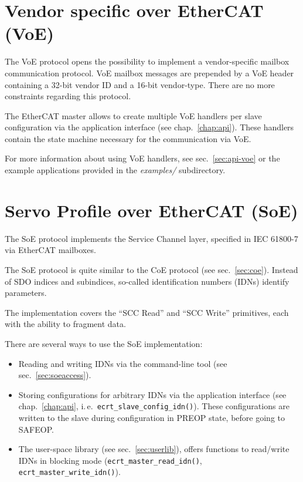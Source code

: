 \documentclass[a4paper,12pt,BCOR6mm,bibtotoc,idxtotoc]{scrbook}
\begin{document}

\section{Vendor specific over EtherCAT (VoE)}
\label{sec:voe}

The VoE protocol opens the possibility to implement a vendor-specific mailbox
communication protocol. VoE mailbox messages are prepended by a VoE header
containing a 32-bit vendor ID and a 16-bit vendor-type. There are no more
constraints regarding this protocol.

The EtherCAT master allows to create multiple VoE handlers per slave
configuration via the application interface (see chap.~\ref{chap:api}). These
handlers contain the state machine necessary for the communication via VoE.

For more information about using VoE handlers, see sec.~\ref{sec:api-voe} or
the example applications provided in the \textit{examples/} subdirectory.


\section{Servo Profile over EtherCAT (SoE)}
\label{sec:soe}

The SoE protocol implements the Service Channel layer, specified in IEC
61800-7 \cite{soespec} via EtherCAT mailboxes.

The SoE protocol is quite similar to the CoE protocol (see
sec.~\ref{sec:coe}). Instead of SDO indices and subindices, so-called
identification numbers (IDNs) identify parameters.

The implementation covers the ``SCC Read'' and ``SCC Write'' primitives, each
with the ability to fragment data.

There are several ways to use the SoE implementation:

\begin{itemize}

\item Reading and writing IDNs via the command-line tool (see
sec.~\ref{sec:soeaccess}).

\item Storing configurations for arbitrary IDNs via the application interface
(see chap.~\ref{chap:api}, i.\,e.~\lstinline+ecrt_slave_config_idn()+). These
configurations are written to the slave during configuration in PREOP state,
before going to SAFEOP.

\item The user-space library (see sec.~\ref{sec:userlib}), offers functions to
read/write IDNs in blocking mode (\lstinline+ecrt_master_read_idn()+,
\lstinline+ecrt_master_write_idn()+).

\end{itemize}
\end{document}
